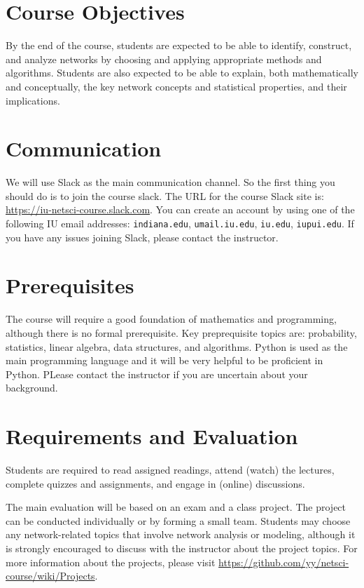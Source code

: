 \documentclass[11pt,article,oneside]{memoir} %
\begin{document}
\section{Course Objectives} %

By the end of the course, students are expected to be able to identify,
construct, and analyze networks by choosing and applying appropriate methods
and algorithms. Students are also expected to be able to explain, both
mathematically and conceptually, the key network concepts and statistical
properties, and their implications. 
\section{Communication} %

We will use Slack as the main communication channel. So the first thing you
should do is to join the course slack. The URL for the course Slack site is:
\url{https://iu-netsci-course.slack.com}. You can create an account by using
one of the following IU email addresses: \texttt{indiana.edu},
\texttt{umail.iu.edu}, \texttt{iu.edu}, \texttt{iupui.edu}. If you have any
issues joining Slack, please contact the instructor. 

\section{Prerequisites} %

The course will require a good foundation of mathematics and programming,
although there is no formal prerequisite. Key preprequisite topics are:
probability, statistics, linear algebra, data structures, and algorithms.
Python is used as the main programming language and it will be very helpful to
be proficient in Python. PLease contact the instructor if you are uncertain
about your background.

\section{Requirements and Evaluation} %

Students are required to read assigned readings, attend (watch) the lectures,
complete quizzes and assignments, and engage in (online) discussions. 

The main evaluation will be based on an exam and a class project. The project
can be conducted individually or by forming a small team. Students may choose
any network-related topics that involve network analysis or modeling, although
it is strongly encouraged to discuss with the instructor about the project
topics. For more information about the projects, please visit
\url{https://github.com/yy/netsci-course/wiki/Projects}.
\end{document}
